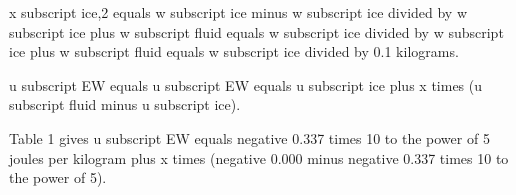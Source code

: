 x subscript ice,2 equals w subscript ice minus w subscript ice divided by w subscript ice plus w subscript fluid equals w subscript ice divided by w subscript ice plus w subscript fluid equals w subscript ice divided by 0.1 kilograms.  

u subscript EW equals u subscript EW equals u subscript ice plus x times (u subscript fluid minus u subscript ice).  

Table 1 gives u subscript EW equals negative 0.337 times 10 to the power of 5 joules per kilogram plus x times (negative 0.000 minus negative 0.337 times 10 to the power of 5).